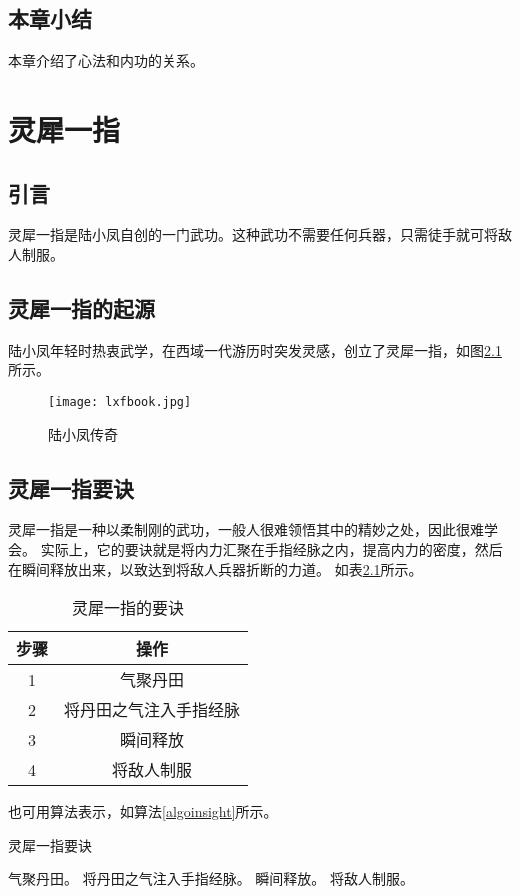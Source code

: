 \documentclass[algorithmlist, figurelist,tablelist, nomlist,masters]{seuthesix}
\begin{document}
\section{本章小结}
本章介绍了心法和内功的关系。

\chapter{灵犀一指}
\section{引言}
灵犀一指是陆小凤自创的一门武功。这种武功不需要任何兵器，只需徒手就可将敌人制服。

\section{灵犀一指的起源}
陆小凤年轻时热衷武学，在西域一代游历时突发灵感，创立了灵犀一指，如图\ref{lxfbook}所示。

\begin{figure}
\centering
\texttt{[image: lxfbook.jpg]}
\caption{陆小凤传奇\label{lxfbook}}
\end{figure}

\section{灵犀一指要诀}
灵犀一指是一种以柔制刚的武功，一般人很难领悟其中的精妙之处，因此很难学会。\cite{lxf:a}
实际上，它的要诀就是将内力汇聚在手指经脉之内，提高内力的密度，然后在瞬间释放出来，以致达到将敌人兵器折断的力道。
如表\ref{lxfinsight}所示。
\begin{table}
\centering
\caption{灵犀一指的要诀\label{lxfinsight}}
\begin{tabular}{|c||c|}
\hline
步骤 & 操作\\
\hline\hline
1 &  气聚丹田\\
\hline
2 & 将丹田之气注入手指经脉\\
\hline
3 & 瞬间释放\\
\hline
4 & 将敌人制服\\
\hline
\end{tabular}
\end{table}

也可用算法表示，如算法\ref{algoinsight}所示。

\begin{algorithm}
\caption{\label{algoinsight}灵犀一指要诀}
\begin{algorithmic}[1]
\STATE 气聚丹田。
\STATE 将丹田之气注入手指经脉。
\STATE 瞬间释放。
\STATE 将敌人制服。
\end{algorithmic}
\end{algorithm}
\end{document}
